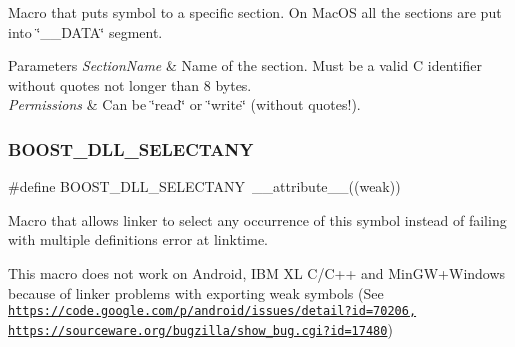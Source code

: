Macro that puts symbol to a specific section. On Mac\+OS all the sections are put into \char`\"{}\+\_\+\+\_\+\+D\+A\+T\+A\char`\"{} segment. 


\begin{DoxyParams}{Parameters}
{\em Section\+Name} & Name of the section. Must be a valid C identifier without quotes not longer than 8 bytes. \\
\hline
{\em Permissions} & Can be \char`\"{}read\char`\"{} or \char`\"{}write\char`\"{} (without quotes!). \\
\hline
\end{DoxyParams}
\mbox{\label{a00200_a18e217f7c26bce9cb08c64f41fbd6178}} 
\subsubsection{\texorpdfstring{B\+O\+O\+S\+T\+\_\+\+D\+L\+L\+\_\+\+S\+E\+L\+E\+C\+T\+A\+NY}{BOOST\_DLL\_SELECTANY}}
{\footnotesize\ttfamily \#define B\+O\+O\+S\+T\+\_\+\+D\+L\+L\+\_\+\+S\+E\+L\+E\+C\+T\+A\+NY~\+\_\+\+\_\+attribute\+\_\+\+\_\+((weak))}



Macro that allows linker to select any occurrence of this symbol instead of failing with \textquotesingle{}multiple definitions\textquotesingle{} error at linktime. 

This macro does not work on Android, I\+BM XL C/\+C++ and Min\+G\+W+\+Windows because of linker problems with exporting weak symbols (See \href{https://code.google.com/p/android/issues/detail?id=70206,}{\tt https\+://code.\+google.\+com/p/android/issues/detail?id=70206,} \href{https://sourceware.org/bugzilla/show_bug.cgi?id=17480}{\tt https\+://sourceware.\+org/bugzilla/show\+\_\+bug.\+cgi?id=17480}) 